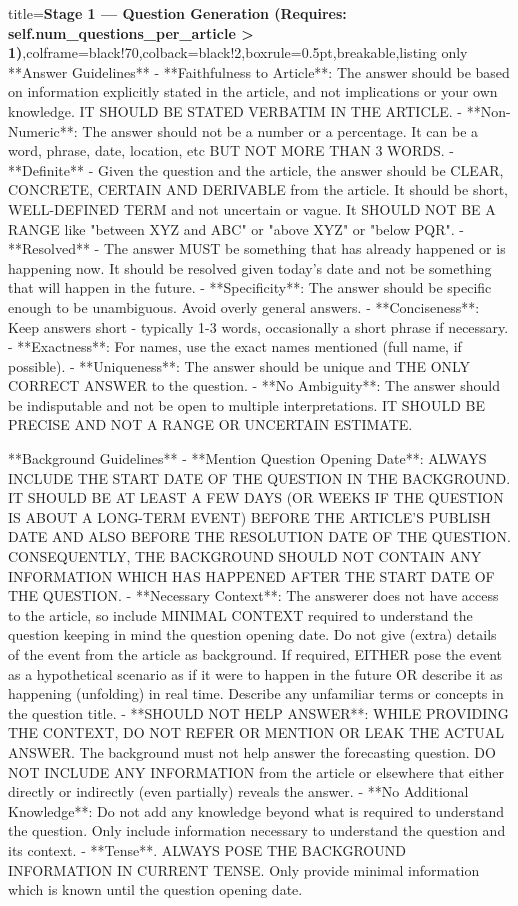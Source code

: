 \documentclass{article} %
\begin{document}
\begin{tcblisting}{title={\textbf{Stage 1 --- Question Generation (Requires:  self.num\_questions\_per\_article > 1)}},colframe=black!70,colback=black!2,boxrule=0.5pt,breakable,listing only}
**Answer Guidelines**
- **Faithfulness to Article**: The answer should be based on information explicitly stated in the article, and not implications or your own knowledge. IT SHOULD BE STATED VERBATIM IN THE ARTICLE.
- **Non-Numeric**: The answer should not be a number or a percentage. It can be a word, phrase, date, location, etc BUT NOT MORE THAN 3 WORDS.
- **Definite** - Given the question and the article, the answer should be CLEAR, CONCRETE, CERTAIN AND DERIVABLE from the article. It should be short, WELL-DEFINED TERM and not uncertain or vague. It SHOULD NOT BE A RANGE like "between XYZ and ABC" or "above XYZ" or "below PQR".
- **Resolved** - The answer MUST be something that has already happened or is happening now. It should be resolved given today's date and not be something that will happen in the future.
- **Specificity**: The answer should be specific enough to be unambiguous. Avoid overly general answers.
- **Conciseness**: Keep answers short - typically 1-3 words, occasionally a short phrase if necessary.
- **Exactness**: For names, use the exact names mentioned (full name, if possible).
- **Uniqueness**: The answer should be unique and THE ONLY CORRECT ANSWER to the question. 
- **No Ambiguity**: The answer should be indisputable and not be open to multiple interpretations. IT SHOULD BE PRECISE AND NOT A RANGE OR UNCERTAIN ESTIMATE.

**Background Guidelines**
- **Mention Question Opening Date**: ALWAYS INCLUDE THE START DATE OF THE QUESTION IN THE BACKGROUND. IT SHOULD BE AT LEAST A FEW DAYS (OR WEEKS IF THE QUESTION IS ABOUT A LONG-TERM EVENT) BEFORE THE ARTICLE'S PUBLISH DATE AND ALSO BEFORE THE RESOLUTION DATE OF THE QUESTION. CONSEQUENTLY, THE BACKGROUND SHOULD NOT CONTAIN ANY INFORMATION WHICH HAS HAPPENED AFTER THE START DATE OF THE QUESTION.
- **Necessary Context**: The answerer does not have access to the article, so include MINIMAL CONTEXT required to understand the question keeping in mind the question opening date. Do not give (extra) details of the event from the article as background. If required, EITHER pose the event as a hypothetical scenario as if it were to happen in the future OR describe it as happening (unfolding) in real time. Describe any unfamiliar terms or concepts in the question title. 
- **SHOULD NOT HELP ANSWER**: WHILE PROVIDING THE CONTEXT, DO NOT REFER OR MENTION OR LEAK THE ACTUAL ANSWER. The background must not help answer the forecasting question. DO NOT INCLUDE ANY INFORMATION from the article or elsewhere that either directly or indirectly (even partially) reveals the answer.
- **No Additional Knowledge**: Do not add any knowledge beyond what is required to understand the question. Only include information necessary to understand the question and its context. 
- **Tense**. ALWAYS POSE THE BACKGROUND INFORMATION IN CURRENT TENSE. Only provide minimal information which is known until the question opening date.


\end{tcblisting}
\end{document}
